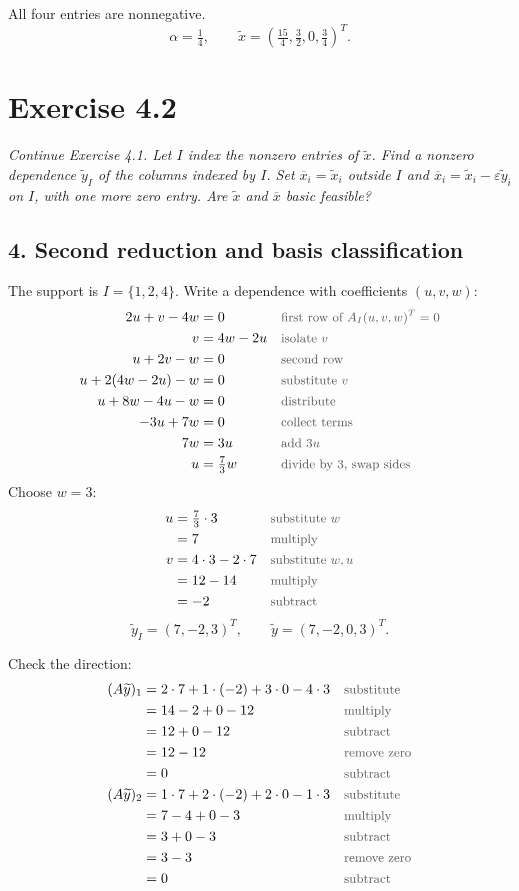 \documentclass[a4paper,11pt]{article}
\newif\ifexplain
\newcommand{\aufgabe}[1]{\section*{Exercise #1}}
\newcommand{\angabe}[1]{\textit{#1}\par\smallskip}
\newcommand{\teil}[1]{\subsection*{#1}}
\newcommand{\why}[1]{\text{\small\color{black!65}#1}}
\newcommand{\explain}[1]{\ifexplain\begin{erklbox}#1\end{erklbox}\fi}
\begin{document}
All four entries are nonnegative.
\[\boxed{\alpha=\tfrac14,\qquad \widetilde x=(\tfrac{15}{4},\tfrac32,0,\tfrac34)^T.}\]
\explain{Die Probe kontrolliert die neue Lösung direkt in den ursprünglichen Gleichungen. Wir haben jetzt eine Nullstelle mehr, aber noch drei positive Komponenten. Das ist ein Fortschritt auf dem Weg zur Basislösung, noch nicht die Basislösung selbst.}

\aufgabe{4.2}
\angabe{Continue Exercise 4.1. Let $I$ index the nonzero entries of $\widetilde x$. Find a nonzero dependence $\widetilde y_I$ of the columns indexed by $I$. Set $\overline x_i=\widetilde x_i$ outside $I$ and $\overline x_i=\widetilde x_i-\varepsilon\widetilde y_i$ on $I$, with one more zero entry. Are $\widetilde x$ and $\overline x$ basic feasible?}
\teil{4. Second reduction and basis classification}
The support is $I=\{1,2,4\}$. Write a dependence with coefficients $(u,v,w)$:
\begin{align*}
2u+v-4w&=0&&\why{first row of $A_I(u,v,w)^T=0$}\\
v&=4w-2u&&\why{isolate $v$}\\
u+2v-w&=0&&\why{second row}\\
u+2(4w-2u)-w&=0&&\why{substitute $v$}\\
u+8w-4u-w&=0&&\why{distribute}\\
-3u+7w&=0&&\why{collect terms}\\
7w&=3u&&\why{add $3u$}\\
u&=\tfrac73w&&\why{divide by 3, swap sides}
\end{align*}
Choose $w=3$:
\begin{align*}
u&=\tfrac73\cdot3&&\why{substitute $w$}\\
&=7&&\why{multiply}\\
v&=4\cdot3-2\cdot7&&\why{substitute $w,u$}\\
&=12-14&&\why{multiply}\\
&=-2&&\why{subtract}
\end{align*}
\[\boxed{\widetilde y_I=(7,-2,3)^T,\qquad \widetilde y=(7,-2,0,3)^T.}\]
\explain{Wir verwenden jetzt nur Spalten mit noch positivem Eintrag. Die dritte Komponente der Richtung setzen wir auf null, damit $\widetilde x_3=0$ erhalten bleibt. Drei Spalten in einem Raum mit Rang zwei sind abhängig. Die Wahl $w=3$ vermeidet Brüche in der Richtung; jede andere von null verschiedene Skalierung wäre ebenfalls möglich.}
Check the direction:
\begin{align*}
(A\widetilde y)_1&=2\cdot7+1\cdot(-2)+3\cdot0-4\cdot3&&\why{substitute}\\
&=14-2+0-12&&\why{multiply}\\
&=12+0-12&&\why{subtract}\\
&=12-12&&\why{remove zero}\\
&=0&&\why{subtract}\\
(A\widetilde y)_2&=1\cdot7+2\cdot(-2)+2\cdot0-1\cdot3&&\why{substitute}\\
&=7-4+0-3&&\why{multiply}\\
&=3+0-3&&\why{subtract}\\
&=3-3&&\why{remove zero}\\
&=0&&\why{subtract}
\end{align*}
\end{document}
